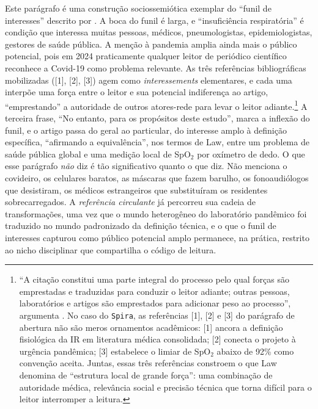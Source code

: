 Este parágrafo é uma construção sociossemiótica exemplar do \enquote{funil de interesses} descrito por \textcite{Law1986Laboratories}. A boca do funil é larga, e \enquote{insuficiência respiratória} é condição que interessa muitas pessoas, médicos, pneumologistas, epidemiologistas, gestores de saúde pública. A menção à pandemia amplia ainda mais o público potencial, pois em 2024 praticamente qualquer leitor de periódico científico reconhece a Covid-19 como problema relevante. As três referências bibliográficas mobilizadas ([1], [2], [3]) agem como \textit{interessements} elementares, e cada uma interpõe uma força entre o leitor e sua potencial indiferença ao artigo, \enquote{emprestando} a autoridade de outros atores-rede para levar o leitor adiante.\footnote{\enquote{A citação constitui uma parte integral do processo pelo qual forças são emprestadas e traduzidas para conduzir o leitor adiante; outras pessoas, laboratórios e artigos são emprestados para adicionar peso ao processo}, argumenta \textcite[p.~79]{Law1986Laboratories}. No caso do \texttt{Spira}, as referências [1], [2] e [3] do parágrafo de abertura não são meros ornamentos acadêmicos: [1] ancora a definição fisiológica da IR em literatura médica consolidada; [2] conecta o projeto à urgência pandêmica; [3] estabelece o limiar de SpO$_2$ abaixo de 92\% como convenção aceita. Juntas, essas três referências constroem o que Law denomina de \enquote{estrutura local de grande força}: uma combinação de autoridade médica, relevância social e precisão técnica que torna difícil para o leitor interromper a leitura.} A terceira frase, \enquote{No entanto, para os propósitos deste estudo}, marca a inflexão do funil, e o artigo passa do geral ao particular, do interesse amplo à definição específica, \enquote{afirmando a equivalência}, nos termos de Law, entre um problema de saúde pública global e uma medição local de SpO$_2$ por oxímetro de dedo. O que esse parágrafo \textit{não} diz é tão significativo quanto o que diz. Não menciona o covideiro, os celulares baratos, as máscaras que fazem barulho, os fonoaudiólogos que desistiram, os médicos estrangeiros que substituíram os residentes sobrecarregados. A \textit{referência circulante} \parencite{Latour2017Esperanca} já percorreu sua cadeia de transformações, uma vez que o mundo heterogêneo do laboratório pandêmico foi traduzido no mundo padronizado da definição técnica, e o que o funil de interesses capturou como público potencial amplo permanece, na prática, restrito ao nicho disciplinar que compartilha o código de leitura.

